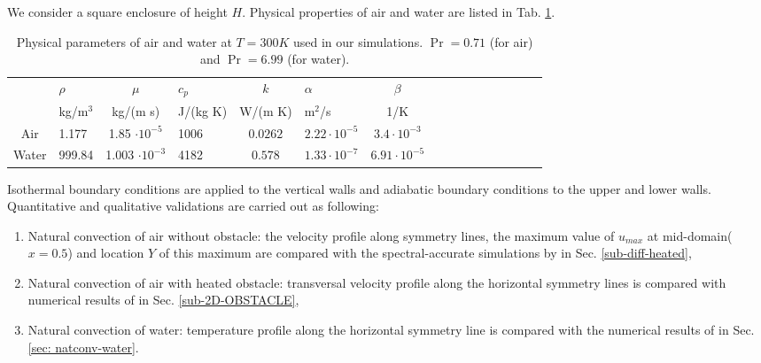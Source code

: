 We consider a square enclosure of height $H$. 
Physical properties of air and water are listed in Tab. \ref{tab-param-phys-air}.
\begin{table}[ht!]
   \begin{center}
      \begin{tabular}{*{8}{cl}}
         
        & $\rho$ &$ \mu$ & $c_p $ & $k$ & $\alpha $ & $\beta$ \\
        & kg/m$^3$& kg/(m s) & J/(kg K) & W/(m K) & m$^2$/s & 1/K \\
         \hline
        Air & 1.177 & 1.85 $\cdot 10^{-5}$  & 1006 & $0.0262$ & $2.22 \cdot 10^{-5}$ & $3.4 \cdot 10^{-3}$ \\
        Water & 999.84 & 1.003 $\cdot 10^{-3}$  & 4182 & $0.578$ & $1.33 \cdot 10^{-7}$ & $6.91 \cdot 10^{-5}$
      \end{tabular}
   \end{center}
   \caption{Physical parameters of air and water at $T = 300K$ used in our simulations. $\Pr = 0.71$ (for air) and $\Pr = 6.99$ (for water).}
   \label{tab-param-phys-air}
\end{table}

\noindent Isothermal boundary conditions are applied to the vertical walls and adiabatic boundary conditions to the upper and lower walls.
Quantitative and qualitative validations are carried out as following:
\begin{enumerate}[label=(\roman*)]
\item Natural convection of air without obstacle: the velocity profile along symmetry lines, the maximum value of $u_{max}$ at mid-domain($x=0.5$) and location $Y$ of this maximum  are compared with the spectral-accurate simulations by \cite{LeQuere91} in Sec. \ref{sub-diff-heated}, 
\item Natural convection of air with heated obstacle: transversal velocity profile along the  horizontal symmetry lines is compared with numerical results of \cite{Raluca2013} 
in Sec. \ref{sub-2D-OBSTACLE}, 
\item Natural convection of water: temperature profile along the horizontal symmetry line is compared with the numerical results of \cite{Kowalewski-2003} in Sec. \ref{sec: natconv-water}.

\end{enumerate}

